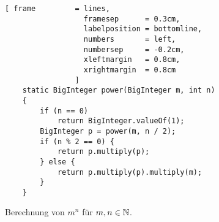 \begin{figure}[!h]
  \centering
\begin{Verbatim}[ frame         = lines, 
                  framesep      = 0.3cm, 
                  labelposition = bottomline,
                  numbers       = left,
                  numbersep     = -0.2cm,
                  xleftmargin   = 0.8cm,
                  xrightmargin  = 0.8cm
                ]
    static BigInteger power(BigInteger m, int n)
    {
        if (n == 0)
            return BigInteger.valueOf(1);
        BigInteger p = power(m, n / 2);
        if (n % 2 == 0) {
            return p.multiply(p);
        } else {
            return p.multiply(p).multiply(m);
        }
    }
\end{Verbatim}
\vspace*{-0.3cm}
  \caption{Berechnung von $m^n$ f\"ur $m,n \in {\mathbb N}$.}
  \label{fig:power}
\end{figure} 

